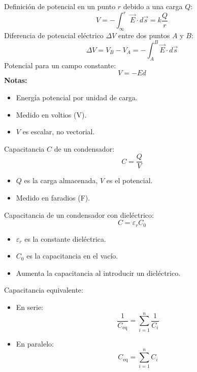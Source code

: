 \begin{tcolorbox}[title=Potencial Eléctrico]
  Definición de potencial en un punto \(r\) debido a una carga \(Q\):
  \[
    V = -\int_{\infty}^{r} \vec{E} \cdot d\vec{s} = k \frac{Q}{r}
  \]
  Diferencia de potencial eléctrico \(\Delta V\) entre dos puntos \(A\) y \(B\):
  \[
    \Delta V = V_B - V_A = -\int_{A}^{B} \vec{E} \cdot d\vec{s}
  \]
  Potencial para un campo constante:
  \[
    V = -Ed
  \]
  \textbf{Notas:}
  \begin{itemize}
    \item Energía potencial por unidad de carga.
    \item Medido en voltios (V).
    \item \(V\) es escalar, no vectorial.
  \end{itemize}
\end{tcolorbox}

\begin{tcolorbox}[title=Capacitancia]
  Capacitancia \(C\) de un condensador:
  \[
    C = \frac{Q}{V}
  \]
  \begin{itemize}
    \item \(Q\) es la carga almacenada, \(V\) es el potencial.
    \item Medido en faradios (F).
  \end{itemize}
  Capacitancia de un condensador con dieléctrico:
  \[
    C = \varepsilon_r C_0
  \]
  \begin{itemize}
    \item \(\varepsilon_r\) es la constante dieléctrica.
    \item \(C_0\) es la capacitancia en el vacío.
    \item Aumenta la capacitancia al introducir un dieléctrico.
  \end{itemize}
  Capacitancia equivalente:
  \begin{itemize}
    \item En serie:
      \[
        \frac{1}{C_{\text{eq}}} = \sum_{i=1}^{n} \frac{1}{C_i}
      \]
    \item En paralelo:
      \[
        C_{\text{eq}} = \sum_{i=1}^{n} C_i
      \]
  \end{itemize}
\end{tcolorbox}

\newpage